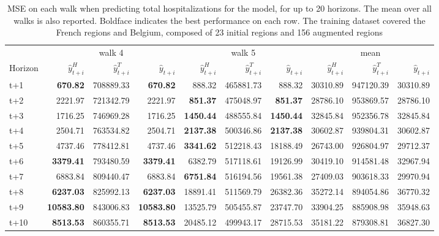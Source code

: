 \begin{table}[H]
\centering
\caption{MSE on each walk when predicting total hospitalizations for the model, for up to 20 horizons. The mean over all walks is also reported. Boldface indicates the best performance on each row. The training dataset covered the French regions and Belgium, composed of 23 initial regions and 156 augmented regions }
\label{tab:MSE_walk_assemble}
\begin{tabular}{lrrrrrrrrr}
\toprule
 & \multicolumn{3}{c}{walk 4} & \multicolumn{3}{c}{walk 5} & \multicolumn{3}{c}{mean} 
\\

\cmidrule(lr){2-4} \cmidrule(lr){5-7} \cmidrule(lr){8-10} 
Horizon & $\hat{y}_{t+i}^H$ & $\hat{y}_{t+i}^T$ & $\hat{y}_{t+i}$ & $\hat{y}_{t+i}^H$ & $\hat{y}_{t+i}^T$ & $\hat{y}_{t+i}$ & $\hat{y}_{t+i}^H$ & $\hat{y}_{t+i}^T$ & $\hat{y}_{t+i}$ \\
\midrule
t+1  & \textbf{670.82}  & 708889.33  & \textbf{670.82}  & 888.32  & 465881.73  & 888.32  & 30310.89  & 947120.39  & 30310.89  \\
t+2  & 2221.97  & 721342.79  & 2221.97  & \textbf{851.37}  & 475048.97  & \textbf{851.37}  & 28786.10  & 953869.57  & 28786.10  \\
t+3  & 1716.25  & 746969.28  & 1716.25  & \textbf{1450.44}  & 488555.84  & \textbf{1450.44}  & 32845.84  & 952356.78  & 32845.84  \\
t+4  & 2504.71  & 763534.82  & 2504.71  & \textbf{2137.38}  & 500346.86  & \textbf{2137.38}  & 30602.87  & 939804.31  & 30602.87  \\
t+5  & 4737.46  & 778412.81  & 4737.46  & \textbf{3341.62}  & 512218.43  & 18188.49  & 26743.00  & 926804.97  & 29712.37  \\
t+6  & \textbf{3379.41}  & 793480.59  & \textbf{3379.41}  & 6382.79  & 517118.61  & 19126.99  & 30419.10  & 914581.48  & 32967.94  \\
t+7  & 6883.84  & 809440.47  & 6883.84  & \textbf{6751.84}  & 516194.56  & 19561.38  & 27409.03  & 903618.33  & 29970.94  \\
t+8  & \textbf{6237.03}  & 825992.13  & \textbf{6237.03}  & 18891.41  & 511569.79  & 26382.36  & 35272.14  & 894054.86  & 36770.32  \\
t+9  & \textbf{10583.80}  & 843006.83  & \textbf{10583.80}  & 13525.79  & 505455.87  & 23747.70  & 33904.25  & 885908.98  & 35948.63  \\
t+10  & \textbf{8513.53}  & 860355.71  & \textbf{8513.53}  & 20485.12  & 499943.17  & 28715.53  & 35181.22  & 879308.81  & 36827.30  \\

\end{tabular}
\end{table}
